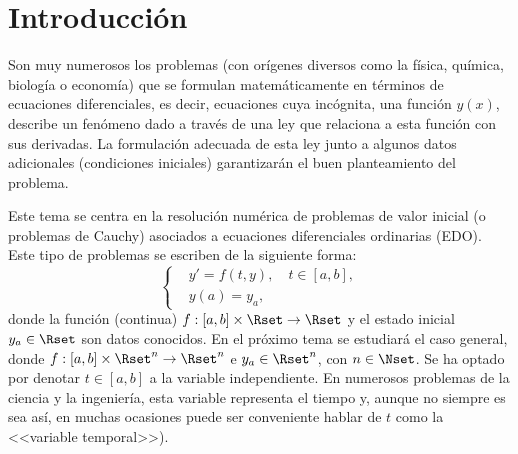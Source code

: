 %
%
\renewcommand{\tt}{t}
\newcommand{\yy}{y}
\newcommand{\yn}{{\yy_n}}
\newcommand{\ynn}{{\yy_{n+1}}}
\newcommand{\ta}{a}
\newcommand{\tb}{b}
\newcommand{\tn}{{\tt_n}}
\newcommand{\tnn}{{\tt_{n+1}}}
\newcommand{\zn}{{z_n}}
\newcommand{\znn}{{z_{n+1}}}
\newcommand{\ycero}{{y_a}}
\newcommand{\sol}{g}
\newcommand{\lipschitz}{$y$--Lipschitz\xspace}
\newcommand{\locLipschitz}{localmente \lipschitz}
\newcommand{\globLipschitz}{\lipschitz}
\newcommand{\errCons}{{\cal E}}
\newcommand{\RK}{Runge--Kutta\xspace}
\newcommand{\AB}{Adams--Bashforth\xspace}
\newcommand{\AM}{Adams--Moulton\xspace}


\section{Introducción}

Son muy numerosos los problemas (con orígenes diversos como la física,
química, biología o economía) que se formulan matemáticamente en
términos de ecuaciones diferenciales, es decir, ecuaciones cuya
incógnita, una función $y(x)$, describe un fenómeno dado a través de
una ley que relaciona a esta función con sus derivadas. La formulación
adecuada de esta ley junto a algunos datos adicionales (condiciones
iniciales) garantizarán el buen planteamiento del problema.

Este tema se centra en la resolución numérica de problemas de valor
inicial (o problemas de Cauchy) asociados a ecuaciones diferenciales
ordinarias (EDO). Este tipo de problemas se escriben de la siguiente
forma:
\begin{equation}
  \label{eq:pvi}
  \tag{PVI}
  \left\{
  \begin{aligned}
    &y' = f(\tt,\yy), \quad \tt\in[\ta,\tb],
    \\
    &y(\ta) = \ycero,
  \end{aligned}
  \right.
\end{equation}
donde la función (continua) $f:[\ta,\tb]\times\Rset\to\Rset$ y el
estado inicial $\ycero\in\Rset$ son datos conocidos. En el próximo
tema se estudiará el caso general, donde
$f:[\ta,\tb]\times\Rset^n\to\Rset^n$ e $\ycero\in\Rset^n$, con
$n\in\Nset$. Se ha optado por denotar $t\in [a,b]$ a la variable
independiente.  En numerosos problemas de la ciencia y la ingeniería,
esta variable representa el tiempo y, aunque no siempre es
sea así, en muchas ocasiones puede ser conveniente
hablar de $\tt$ como la <<variable temporal>>).


